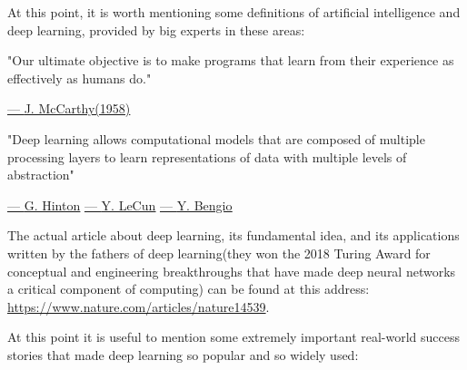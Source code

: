 \vspace{5mm}

At this point, it is worth mentioning some definitions of artificial
intelligence and deep learning, provided by big experts in these areas:

\vspace{5mm}

\begin{quoting}
    "Our ultimate objective is to make programs that learn from their
    experience as effectively as humans do."
\end{quoting}

\hspace{306pt}
\href{https://en.wikipedia.org/wiki/John_McCarthy_(computer_scientist)}{--- \underline{J. McCarthy(1958)}}

\vspace{5mm}

\begin{quoting}
    "Deep learning allows computational models that are composed of
    multiple processing layers to learn representations of data with
    multiple levels of abstraction"
\end{quoting}

\hspace{210pt}
\href{https://en.wikipedia.org/wiki/Geoffrey_Hinton}{--- \underline{G. Hinton}}
\href{https://en.wikipedia.org/wiki/Yann_LeCun}{--- \underline{Y. LeCun}}
\href{https://en.wikipedia.org/wiki/Yoshua_Bengio}{--- \underline{Y. Bengio}}

\newpage

The actual article about deep learning, its fundamental idea, and its
applications written by the fathers of deep learning(they won
the 2018 Turing Award for conceptual and engineering breakthroughs that
have made deep neural networks a critical component of computing) can be
found at this address:
\url{https://www.nature.com/articles/nature14539}.

At this point it is useful to mention some extremely important real-world
success stories that made deep learning so popular and so widely used:

